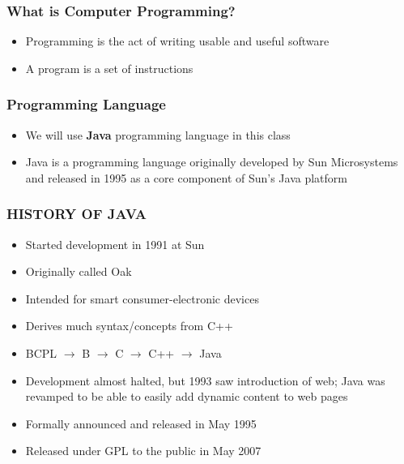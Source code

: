 \documentclass{beamer}
\begin{document}
\begin{frame}
  \frametitle{What is Computer Programming?}
		\pause
      \begin{itemize}
        \item Programming is the act of writing usable and useful software
        \item A program is a set of instructions
    \end{itemize}
\end{frame}

\begin{frame}
  \frametitle{Programming Language}
	\begin{itemize}
		\item We will use \textbf{Java} programming language in this class
		\item Java is a programming language originally developed by Sun Microsystems and released in 1995 as a core component of Sun's Java platform
    \end{itemize}
\end{frame}

\begin{frame}
  \frametitle{HISTORY OF JAVA}
    \begin{itemize}
        \item Started development in 1991 at Sun
		\item Originally called Oak
		\item Intended for smart consumer-electronic devices
		\item Derives much syntax/concepts from C++
		\item BCPL $\rightarrow$ B $\rightarrow$ C $\rightarrow$ C++ $\rightarrow$ Java
		\item Development almost halted, but 1993 saw introduction of web; Java was revamped to be able to easily add dynamic content to web pages
		\item Formally announced and released in May 1995
		\item Released under GPL to the public in May 2007
    \end{itemize}

\end{frame}
\end{document}
